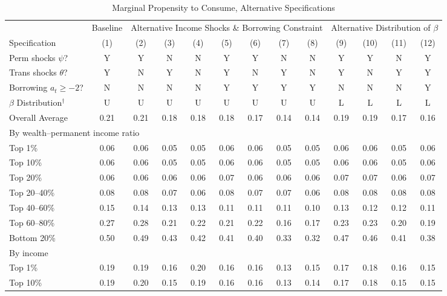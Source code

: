 
\begin{sidewaystable}
 \caption{ Marginal Propensity to Consume, Alternative Specifications } \label{tAltSpec}
\begin{tabular}{l c c c c c c c c c c c c}
\toprule
 & Baseline &  \multicolumn{7}{c}{Alternative Income Shocks \& Borrowing Constraint} & \multicolumn{4}{c}{Alternative Distribution of $\beta$}\\
 \cmidrule(r){3-9} \cmidrule(r){10-13}
Specification & (1) & (2) & (3) & (4) & (5) & (6) & (7) & (8) & (9) & (10) & (11) & (12) \\
Perm shocks $\psi$?   &  Y &   Y &   N &   N &   Y &   Y &   N &   N &   Y &   Y &    N &    Y\\
Trans shocks $\theta$?   &  Y &   N &   Y &   N &   Y &   N &   Y &   N &   Y &   N &    Y &    Y\\
Borrowing $a_t\ge-2$?     &  N &   N &   N &   N &   Y &   Y &   Y &   Y &   N &   N &    N &    Y\\
$\beta$ Distribution${}^\dagger$ & U & U & U & U & U & U & U & U & L & L & L & L \\
\midrule
Overall Average& 0.21 & 0.21 & 0.18 & 0.18 & 0.18 & 0.17 & 0.14 & 0.14 & 0.19 & 0.19 & 0.17 & 0.16\\
\midrule
\multicolumn{13}{l}{By wealth--permanent income ratio }\\
Top 1\%     & 0.06 & 0.06 & 0.05 & 0.05 & 0.06 & 0.06 & 0.05 & 0.05 & 0.06 & 0.06 & 0.05 & 0.06\\
Top 10\%    & 0.06 & 0.06 & 0.05 & 0.05 & 0.06 & 0.06 & 0.05 & 0.05 & 0.06 & 0.06 & 0.05 & 0.06\\
Top 20\%    & 0.06 & 0.06 & 0.06 & 0.06 & 0.07 & 0.06 & 0.06 & 0.06 & 0.07 & 0.07 & 0.06 & 0.07\\
Top 20--40\% & 0.08 & 0.08 & 0.07 & 0.06 & 0.08 & 0.07 & 0.07 & 0.06 & 0.08 & 0.08 & 0.08 & 0.08\\
Top 40--60\% & 0.15 & 0.14 & 0.13 & 0.13 & 0.11 & 0.11 & 0.11 & 0.10 & 0.13 & 0.12 & 0.12 & 0.11\\
Top 60--80\% & 0.27 & 0.28 & 0.21 & 0.22 & 0.21 & 0.22 & 0.16 & 0.17 & 0.23 & 0.23 & 0.20 & 0.19\\
Bottom 20\% & 0.50 & 0.49 & 0.43 & 0.42 & 0.41 & 0.40 & 0.33 & 0.32 & 0.47 & 0.46 & 0.41 & 0.38\\
\multicolumn{13}{l}{By income }\\
Top 1\%     & 0.19 & 0.19 & 0.16 & 0.20 & 0.16 & 0.16 & 0.13 & 0.15 & 0.17 & 0.18 & 0.16 & 0.15\\
Top 10\%    & 0.19 & 0.20 & 0.15 & 0.19 & 0.16 & 0.16 & 0.13 & 0.14 & 0.17 & 0.18 & 0.15 & 0.15\\

\end{tabular}
\end{sidewaystable}
